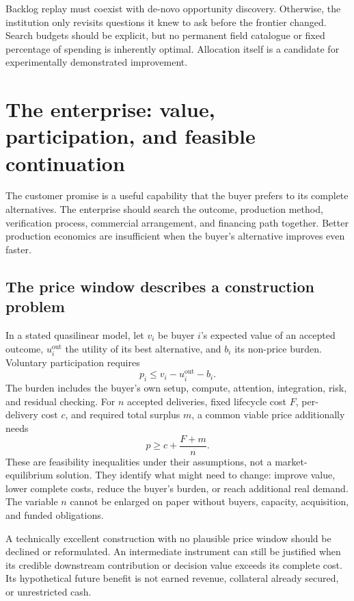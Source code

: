\documentclass[11pt,letterpaper]{article}
\theoremstyle{remark}\newtheorem{remark}{Remark}[section]
\begin{document}
Backlog replay must coexist with de-novo opportunity discovery. Otherwise, the institution only revisits questions it knew to ask before the frontier changed. Search budgets should be explicit, but no permanent field catalogue or fixed percentage of spending is inherently optimal. Allocation itself is a candidate for experimentally demonstrated improvement.

\section{The enterprise: value, participation, and feasible continuation}\label{sec:economics}
The customer promise is a useful capability that the buyer prefers to its complete alternatives. The enterprise should search the outcome, production method, verification process, commercial arrangement, and financing path together. Better production economics are insufficient when the buyer's alternative improves even faster.

\subsection{The price window describes a construction problem}
In a stated quasilinear model, let $v_i$ be buyer $i$'s expected value of an accepted outcome, $u_i^{\mathrm{out}}$ the utility of its best alternative, and $b_i$ its non-price burden. Voluntary participation requires
\begin{equation}
p_i\leq v_i-u_i^{\mathrm{out}}-b_i.
\label{eq:buyer}
\end{equation}
The burden includes the buyer's own setup, compute, attention, integration, risk, and residual checking. For $n$ accepted deliveries, fixed lifecycle cost $F$, per-delivery cost $c$, and required total surplus $m$, a common viable price additionally needs
\begin{equation}
p\geq c+\frac{F+m}{n}.
\label{eq:seller}
\end{equation}
These are feasibility inequalities under their assumptions, not a market-equilibrium solution. They identify what might need to change: improve value, lower complete costs, reduce the buyer's burden, or reach additional real demand. The variable $n$ cannot be enlarged on paper without buyers, capacity, acquisition, and funded obligations.

A technically excellent construction with no plausible price window should be declined or reformulated. An intermediate instrument can still be justified when its credible downstream contribution or decision value exceeds its complete cost. Its hypothetical future benefit is not earned revenue, collateral already secured, or unrestricted cash.
\end{document}
